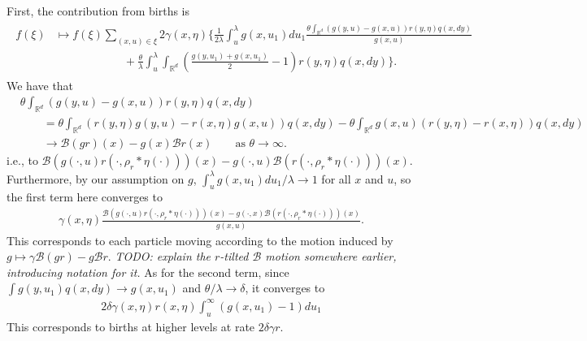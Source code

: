 \documentclass[12pt]{article}
\newcommand{\IR}{\mathbb R}
\newcommand{\DG}{\mathcal{B}}  %
\newcommand{\kernel}{\rho}  %
\newcommand{\smooth}[1]{\kernel_{#1} \! * \!}  %
\newcommand{\lp}{\xi}              %
\newcommand{\comment}[1]{{\color{blue} \it #1}}
\begin{document}
First, the contribution from births is
\begin{align*}
\begin{split}
f(\lp)
&\mapsto
    f(\lp)
    \sum_{(x, u) \in \lp}
    2 \gamma(x, \eta)
    \bigg\{
        \frac{1}{2 \lambda}
        \int_u^\lambda
        g(x, u_1) du_1
        \frac{
            \theta \int_{\IR^d} (g(y, u) - g(x, u)) r(y, \eta) q(x, dy)
        }{
            g(x, u)
        }
    \\ & \qquad \qquad \qquad {}
        + \frac{\theta}{\lambda}
        \int_u^\lambda \int_{\IR^d}
        \left( \frac{g(y, u_1) + g(x, u_1)}{2} - 1 \right)
        r(y, \eta) q(x, dy)
    \bigg\}
    .
    \end{split}
\end{align*}
We have that
\begin{align*}
    &\theta \int_{\IR^d} (g(y, u) - g(x, u)) r(y, \eta) q(x, dy) \\
    &\qquad =
    \theta \int_{\IR^d} (r(y, \eta) g(y, u) - r(x, \eta) g(x, u)) q(x, dy)
    - \theta \int_{\IR^d} g(x, u) (r(y, \eta) - r(x, \eta)) q(x, dy) \\
    &\qquad \to
    \DG(gr)(x) - g(x) \DG r(x) \qquad \text{as }\theta \to \infty.
\end{align*}
i.e., to
$\DG\left(g(\cdot, u) r(\cdot, \smooth{r}\eta(\cdot))\right)(x)
- g(\cdot, u) \DG\left(r(\cdot, \smooth{r}\eta(\cdot))\right)(x)$.
Furthermore, by our assumption on $g$,
$\int_u^\lambda g(x, u_1) du_1 / \lambda \to 1$ for all $x$ and $u$,
so the first term here converges to
\begin{align*}
    \gamma(x, \eta)
        \frac{
            \DG\left( g(\cdot, u) r(\cdot, \smooth{r}\eta(\cdot))\right)(x)
            -
            g(\cdot, x) \DG\left( r(\cdot, \smooth{r}\eta(\cdot))\right)(x)
        }{
            g(x, u)
        } .
\end{align*}
This corresponds to each particle moving according to the motion induced by
$g \mapsto \gamma \DG(gr) - g \DG r$.
\comment{TODO: explain the $r$-tilted $\DG$ motion somewhere earlier, introducing notation for it.}
As for the second term,
since $\int g(y, u_1) q(x, dy) \to g(x, u_1)$
and $\theta/\lambda \to \delta$,
it converges to
\begin{align*}
    2 \delta
    \gamma(x, \eta)
    r(x, \eta) 
    \int_u^\infty
    \left( g(x, u_1) - 1 \right)
    du_1
\end{align*}
This corresponds to births at higher levels at rate $2 \delta \gamma r$.
\end{document}
